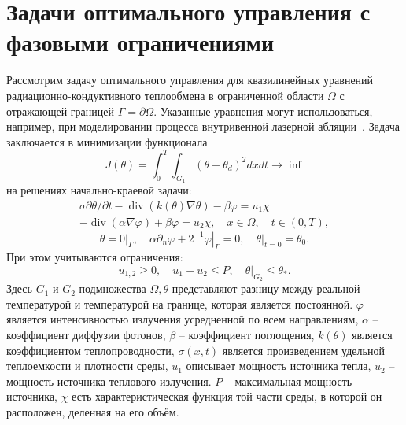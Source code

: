 

\section{Задачи оптимального управления с фазовыми ограничениями}
\label{sec:ch3:sec2}
%
Рассмотрим задачу оптимального
управления для квазилинейных уравнений радиационно-кондуктивного
теплообмена в ограниченной области $\Omega$ с отражающей границей $\Gamma=\partial\Omega$.
Указанные уравнения могут использоваться, например, при моделировании процесса внутривенной
лазерной абляции~\cite{Endovenous_Malskat2014}.
Задача заключается в минимизации функционала
\[ J(\theta)=\int_{0}^{T} \int_{G_{1}}\left(\theta-\theta_{d}\right)^{2} dx dt \rightarrow \inf \]
на решениях начально-краевой задачи:
\begin{equation}
    \label{eq:3_2:1}
    \begin{gathered}
        \sigma \partial \theta / \partial t-\operatorname{div}(k(\theta)
        \nabla \theta)-\beta \varphi=u_{1} \chi \\
        -\operatorname{div}(\alpha \nabla \varphi)+\beta \varphi=u_{2}
        \chi, \quad x \in \Omega, \quad t \in(0, T),
    \end{gathered}
\end{equation}
\begin{equation}
    \label{eq:3_2:2}
    \theta=\left.0\right|_{\Gamma},
    \quad \alpha \partial_{n} \varphi
    +\left.2^{-1} \varphi\right|_{\Gamma}=0,
    \left.\quad \theta\right|_{t=0}=\theta_{0}.
\end{equation}
При этом учитываются ограничения:
\[ u_{1,2} \geq 0, \quad u_{1}+u_{2} \leq P, \left.\quad \theta\right|_{G_{2}} \leq \theta_{*}. \]
Здесь $G_{1}$ и $G_{2}$ подмножества $\Omega, \theta$
представляют разницу между реальной температурой
и температурой на границе, которая является постоянной.
$\varphi$ является интенсивностью излучения усредненной по всем направлениям,
$\alpha$ -- коэффициент диффузии фотонов, $\beta$ -- коэффициент поглощения,
$k(\theta)$ является коэффициентом теплопроводности, $\sigma(x, t)$
является произведением удельной теплоемкости и плотности среды, $u_{1}$
описывает мощность источника тепла, $u_{2}$ -- мощность источника теплового излучения.
$P$ -- максимальная мощность источника,
$\chi$ есть характеристическая функция той части среды,
в которой он расположен, деленная на его объём.

